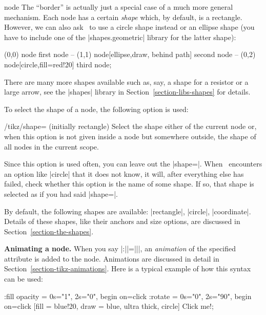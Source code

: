 \begin{pathoperation}{node}
    The ``border'' is actually just a special case of a much more general
    mechanism. Each node has a certain \emph{shape} which, by default, is a
    rectangle. However, we can also ask \tikzname\ to use a circle shape
    instead or an ellipse shape (you have to include one of the
    |shapes.geometric| library for the latter shape):
\begin{codeexample}[preamble={\usetikzlibrary{shapes.geometric}}]
\tikz \fill[fill=yellow!80!black]
      (0,0) node                            {first node}
   -- (1,1) node[ellipse,draw, behind path] {second node}
   -- (0,2) node[circle,fill=red!20]        {third node};
\end{codeexample}

    There are many more shapes available such as, say, a shape for a resistor
    or a large arrow, see the |shapes| library in
    Section~\ref{section-libs-shapes} for details.

    To select the shape of a node, the following option is used:
    \begin{key}{/tikz/shape= (initially rectangle)}
        Select the shape either of the current node or, when this option is not
        given inside a node but somewhere outside, the shape of all nodes in
        the current scope.%

        Since this option is used often, you can leave out the |shape=|. When
        \tikzname\ encounters an option like |circle| that it does not know, it
        will, after everything else has failed, check whether this option is
        the name of some shape. If so, that shape is selected as if you had
        said |shape=|.

        By default, the following shapes are available: |rectangle|, |circle|,
        |coordinate|. Details of these shapes, like their anchors and size
        options, are discussed in Section~\ref{section-the-shapes}.
    \end{key}

    \medskip
    \textbf{Animating a node.}
    When you say |:||={||}|, an
    \emph{animation} of the specified attribute is added to the node.
    Animations are discussed in detail in
    Section~\ref{section-tikz-animations}. Here is a typical example of how
    this syntax can be used:
\begin{codeexample}[preamble={\usetikzlibrary{animations}},animation list={0.5,1,1.5,2}]
\tikz
  \node  :fill opacity = { 0s="1", 2s="0", begin on=click }
         :rotate = { 0s="0", 2s="90", begin on=click }
         [fill = blue!20, draw = blue, ultra thick, circle]
    {Click me!};
\end{codeexample}


\end{pathoperation}
